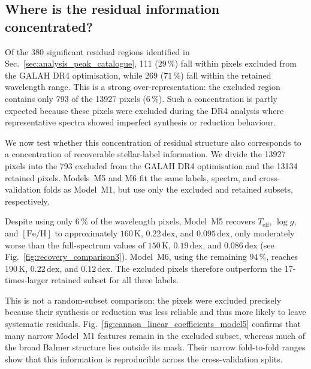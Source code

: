 \documentclass[twocolumn,apj,numberedappendix,appendixfloats]{openjournal}
\begin{document}
\subsection{Where is the residual information concentrated?}
\label{sec:analysis_cannon_masked_pixels}

Of the 380 significant residual regions identified in Sec.~\ref{sec:analysis_peak_catalogue}, 111 ($29\,\mathrm{\%}$) fall within pixels excluded from the GALAH DR4 optimisation, while 269 ($71\,\mathrm{\%}$) fall within the retained wavelength range. This is a strong over-representation: the excluded region contains only 793 of the 13927 pixels ($6\,\mathrm{\%}$). Such a concentration is partly expected because these pixels were excluded during the DR4 analysis where representative spectra showed imperfect synthesis or reduction behaviour.

We now test whether this concentration of residual structure also corresponds to a concentration of recoverable stellar-label information. We divide the 13927 pixels into the 793 excluded from the GALAH DR4 optimisation and the 13134 retained pixels. Models~\textcolor{M5}{M5} and \textcolor{M6}{M6} fit the same labels, spectra, and cross-validation folds as Model~\textcolor{M1}{M1}, but use only the excluded and retained subsets, respectively.

Despite using only $6\,\mathrm{\%}$ of the wavelength pixels, Model~\textcolor{M5}{M5} recovers $T_\mathrm{eff}$, $\log g$, and $[\mathrm{Fe/H}]$ to approximately $160\,\mathrm{K}$, $0.22\,\mathrm{dex}$, and $0.095\,\mathrm{dex}$, only moderately worse than the full-spectrum values of $150\,\mathrm{K}$, $0.19\,\mathrm{dex}$, and $0.086\,\mathrm{dex}$ (see Fig.~\ref{fig:recovery_comparison3}). Model~\textcolor{M6}{M6}, using the remaining $94\,\mathrm{\%}$, reaches $190\,\mathrm{K}$, $0.22\,\mathrm{dex}$, and $0.12\,\mathrm{dex}$. The excluded pixels therefore outperform the 17-times-larger retained subset for all three labels.

This is not a random-subset comparison: the pixels were excluded precisely because their synthesis or reduction was less reliable and thus more likely to leave systematic residuals. Fig.~\ref{fig:cannon_linear_coefficients_model5} confirms that many narrow Model~\textcolor{M1}{M1} features remain in the excluded subset, whereas much of the broad Balmer structure lies outside its mask. Their narrow fold-to-fold ranges show that this information is reproducible across the cross-validation splits.
\end{document}

